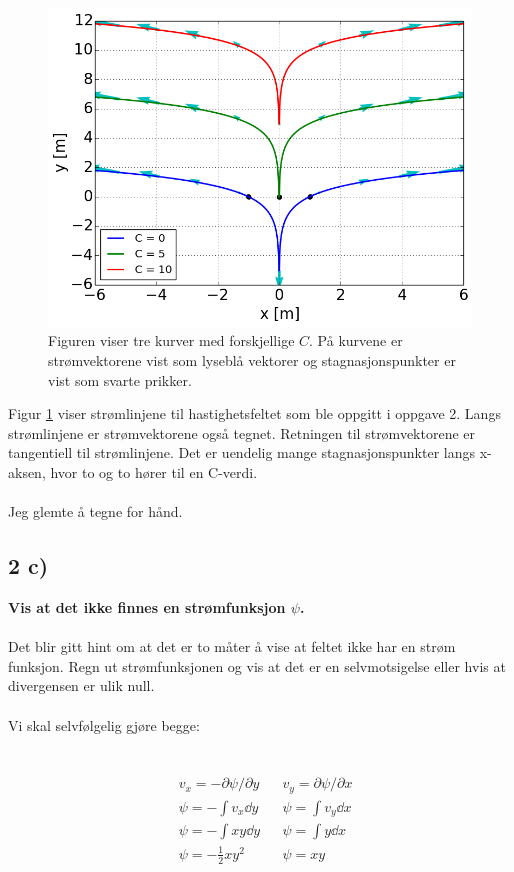 \begin{figure}[H]
		\centering
		\includegraphics[width=0.7\linewidth]{../2b.png}
		\caption{Figuren viser tre kurver med forskjellige $C$.
        På kurvene er strømvektorene vist som lyseblå vektorer
         og stagnasjonspunkter er vist som svarte prikker.}
		\label{fig_2b_test}
\end{figure}

Figur \ref{fig_2b_test} viser strømlinjene til hastighetsfeltet som
ble oppgitt i oppgave 2. Langs strømlinjene er strømvektorene også
tegnet. Retningen til strømvektorene er tangentiell til strømlinjene.
Det er uendelig mange stagnasjonspunkter langs x-aksen, hvor to og to hører
til en C-verdi.
\\
\\
Jeg glemte å tegne for hånd.








\pagebreak
\subsection*{2 c)}
\textbf{Vis at det ikke finnes en strømfunksjon $\psi$.}
\\
\\
Det blir gitt hint om at det er to måter å vise at feltet ikke har en
strøm funksjon. Regn ut strømfunksjonen og vis at det er en selvmotsigelse
eller hvis at divergensen er ulik null.
\\
\\
Vi skal selvfølgelig gjøre begge:
\\
\\
\\
\begin{align*}
    &v_x = -\partial \psi / \partial y
    && v_y = \partial \psi / \partial x
    \\
    &\psi = -\int v_x \dd y
    &&\psi = \int v_y \dd x
    \\
    &\psi = -\int xy \dd y
    &&\psi = \int y \dd x
    \\
    &\psi = - \frac{1}{2} xy^2
    &&\psi =  xy
\end{align*}

